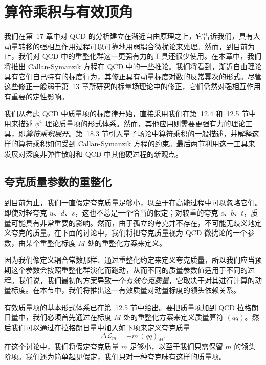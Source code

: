 \chapter{算符乘积与有效顶角}

我们在第~17 章中对 QCD 的分析建立在渐近自由原理之上，它告诉我们，具有大动量转移的强相互作用过程可以可靠地用弱耦合微扰论来处理。然而，到目前为止，我们对 QCD 中的重整化群这一更强有力的工具还很少使用。在本章中，我们将推出 Callan-Symanzik 方程在 QCD 中的一些推论。我们将看到，渐近自由理论具有它们自己特有的标度行为，其修正具有动量标度对数的反常幂次的形式。尽管这些修正一般弱于第~13 章所研究的标量场理论中的修正，它们仍然对强相互作用有重要的定性影响。

我们从考虑 QCD 中质量项的标度律开始，直接采用我们在第~12.4 和~12.5 节中用来描述 $\phi^4$ 理论质量项的形式体系。然而，其他应用则需要更强有力的理论工具，即\emph{算符乘积展开}。第~18.3 节引入量子场论中算符乘积的一般描述，并解释这样的算符乘积如何受到 Callan-Symanzik 方程的约束。最后两节利用这一工具来发展对深度非弹性散射和 QCD 中其他硬过程的新观点。

\section{夸克质量参数的重整化}

到目前为止，我们一直假定夸克质量足够小，以至于在高能过程中可以忽略它们。即使对轻夸克 $u$、$d$、$s$，这也不总是一个恰当的假定；对较重的夸克 $c$、$b$、$t$，质量可能具有非常重要的影响。然而，由于孤立的夸克并不存在，不可能无歧义地定义夸克的质量。在下面的讨论中，我们将把夸克质量视为 QCD 微扰论的一个参数，由某个重整化标度 $M$ 处的重整化方案来定义。

因为我们像定义耦合常数那样、通过重整化约定来定义夸克质量，所以我们应当预期这个参数会按照重整化群演化而跑动，从而不同的质量参数值适用于不同的过程。我们说，我们最初的方案导致一个\emph{有效夸克质量}，它取决于对其进行计算的动量标度。在本节中，我们将推出这一有效质量对动量标度的领头依赖关系。

有效质量项的基本形式体系已在第~12.5 节中给出。要把质量项加到 QCD 拉格朗日量中，我们必须首先通过在标度 $M$ 处的重整化方案来定义质量算符 $(\bar{q}q)$。然后我们可以通过在拉格朗日量中加入如下项来定义夸克质量
\begin{equation}
  \Delta\mathcal{L}_m = -m\,(\bar{q}q)_M .
  \label{eq:18.1}
\end{equation}
在这个讨论中，我们将假定夸克质量 $m$ 足够小，以至于我们只需保留 $m$ 的领头阶项。我们还为简单起见假定，我们只对一种夸克味有这样的质量项。

